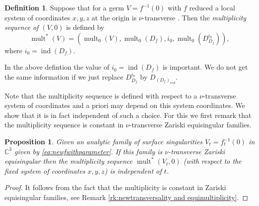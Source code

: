 \documentclass[11pt,a4paper]{amsart}
\newcommand{\1}{{1\!\!1}}
\numberwithin{equation}{section}
\theoremstyle{plain}%
\newtheorem{prop}[thm]{Proposition}
\theoremstyle{definition}
\theoremstyle{definition}
\newtheorem{defn}[thm]{Definition}
\theoremstyle{remark}
\newcommand{\C}{\mathbb{C}}
\newcommand{\kk}{{k}}
\renewcommand{\1}{\mathbf{1}}
\newcommand{\inv}{^{-1}}
\newcommand{\impli}{\varphi}
\DeclareMathOperator{\snu}{mult}
\DeclareMathOperator{\idiscr}{ind}
\DeclareMathOperator{\mult}{mult}
\newcommand{\unt}{$\nu$-transverse }
\newcommand{\multseq}{multiplicity sequence }
\begin{document}


\begin{defn} \label{defn:untmultiplicitysequence}
Suppose that for a germ $V= f\inv (0)$ with $f$ reduced a local  system of coordinates 
$x,y,z$ at the origin is \unt.  
Then the \emph{\multseq of $(V,0)$}  is defined by 
$$\snu^* (V) = (\mult_0  (V), \mult_{0} (D_f ), i_0,  
\mult_{0} 
 (D^{i_0}_{D_f} )),$$
where $i_0=\idiscr (D_f) $.
\end{defn}

In the above defintion the value of $i_0=\idiscr (D_f) $ is important.  We do not get the same information if we just replace $D^{i_0}_{D_f} $  by $D_{(D_f)_{red}} $. 

Note that the  \multseq is defined with respect to a  \unt system of coordinates and 
a priori may depend on this  system coordinates.  We show that it is in fact independent of such a choice.  
For this we first remark that the \multseq  is constant in \unt Zariski equisingular families.  

\begin{prop}\label{prop:families}
Given an analytic family of surface singularities $V_t=f_t\inv (0)$ in $\C^3$  given by
\eqref{eq:newfwithparameter}.   
If this family is \unt Zariski equisingular then the \multseq $\snu^* (V_t,0)$ 
(with respect to the fixed system of coordinates $x,y,z$)  is independent of $t$.  
\end{prop}

\begin{proof}
It follows from the fact that the multiplicity is constant in Zariski equisingular families, see Remark \ref{rk:newtransversality and equimultiplicity}. 
\end{proof}



\end{document}
